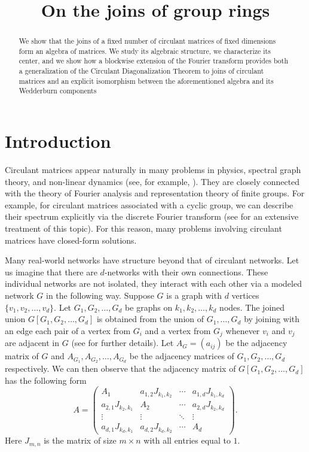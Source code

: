 \documentclass[12pt, a4paper]{amsart}
\title{On the joins of group rings}
\author{}
\date{}
\numberwithin{equation}{section} %
\theoremstyle{plain}
\theoremstyle{definition}
\theoremstyle{plain}
\theoremstyle{remark}
\begin{document}
\maketitle

\begin{abstract}
    We show that the joins of a fixed number of circulant matrices of fixed dimensions form an algebra of matrices. We study its algebraic structure, we characterize its center, and we show how a blockwise extension of the Fourier transform provides both a generalization of the Circulant Diagonalization Theorem to joins of circulant matrices and an explicit isomorphism between the aforementioned algebra and its Wedderburn components
\end{abstract}
\tableofcontents

\section{Introduction}

Circulant matrices appear naturally in many problems in physics, spectral graph theory, and non-linear dynamics (see, for example, \cite{cir1, cir2, cir3, ko1}). They are closely connected with the theory of Fourier analysis and representation theory of finite groups. For example, for circulant matrices associated with a cyclic group, we can describe their spectrum explicitly via the discrete Fourier transform (see \cite{davis2013circulant} for an extensive treatment of this topic). For this reason, many problems involving circulant matrices have closed-form solutions. 


Many real-world networks have structure beyond that of circulant networks. Let us imagine that there are $d$-networks with their own connections. These individual networks are not isolated, they interact with each other via a modeled network $G$ in the following way. Suppose $G$ is a graph with $d$ vertices $\{v_1, v_2, \ldots, v_d\}$. Let $G_1, G_2, \ldots, G_d$ be graphs on $k_1, k_2, \ldots, k_d$ nodes. The joined union $G[G_1, G_2, \ldots, G_d]$ is obtained from the union of $G_1, \ldots, G_d$ by joining with an edge each pair of a vertex from $G_i$ and a vertex from $G_j$ whenever $v_i$ and $v_j$ are adjacent in $G$ (see \cite{joined_union} for further details). Let $A_{G} =(a_{ij})$ be the adjacency matrix of $G$ and $A_{G_1}, A_{G_2}, \ldots, A_{G_d}$ be the adjacency matrices of $G_1, G_2, \ldots, G_d$ respectively. We can then observe that the adjacency matrix of $G[G_1, G_2, \ldots, G_d]$ has the following form 
\begin{equation} \label{eq:joined_union1}
A=\left(\begin{array}{c|c|c|c}
A_1 & a_{1,2} J_{k_1, k_2} & \cdots & a_{1,d} J_{k_1, k_d} \\
\hline
a_{2,1} J_{k_2, k_1} & A_2 & \cdots & a_{2,d} J_{k_2, k_d} \\
\hline
\vdots & \vdots & \ddots & \vdots \\
\hline
a_{d,1} J_{k_d, k_1} & a_{d,2} J_{k_d, k_2} & \cdots & A_d
\end{array}\right).
\end{equation} 
Here $J_{m,n}$ is the matrix of size $m \times n$ with all entries equal to $1.$
\end{document}
